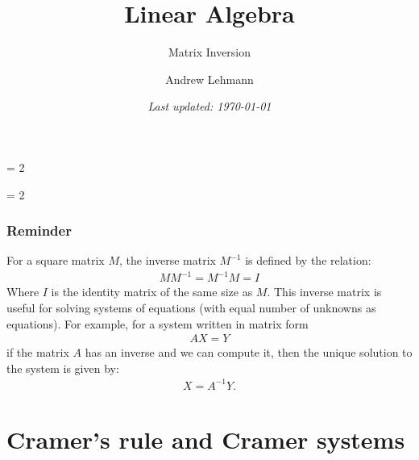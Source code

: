 \documentclass[usenames,dvipsnames,aspectratio=169,10pt]{beamer}
\def \SCHOOLVERSION {2} %
\numberwithin{equation}{section}
\begin{document}
\title{Linear Algebra}
\subtitle{Matrix Inversion}
\author{Andrew Lehmann}
\ifnum \SCHOOLVERSION = 2
\fi
\date{\textit{Last updated: \today}}

\ifnum \SCHOOLVERSION = 2
\fi


\begin{frame}
\titlepage
\end{frame}




\begin{frame}
\frametitle{Reminder}

For a square matrix $M$, the inverse matrix $M^{-1}$ is defined by the relation:
\begin{align*}
M M^{-1} = M^{-1} M = I
\end{align*}
Where $I$ is the identity matrix of the same size as $M$. This inverse matrix is useful for solving systems of equations (with equal number of unknowns as equations). For example, for a system written in matrix form
\begin{align*}
AX = Y
\end{align*}
if the matrix $A$ has an inverse and we can compute it, then the unique solution to the
system is given by:
\begin{align*}
X = A^{-1}Y.
\end{align*}


\end{frame}


\section{Cramer's rule and Cramer systems}
\end{document}
